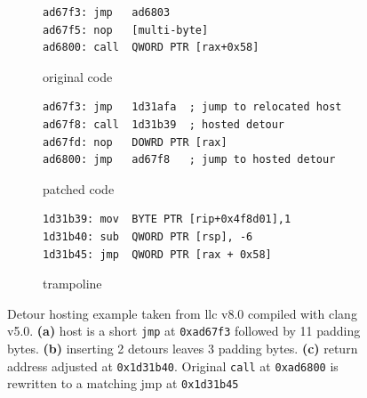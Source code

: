 {%
\begin{figure}[t!]
	\centering
	\vspace{-4pt}
	\begin{subfigure}[t]{\columnwidth}
\begin{lstlisting}[style=custom-x64]
ad67f3: jmp   ad6803
ad67f5: nop   [multi-byte]
ad6800: call  QWORD PTR [rax+0x58]
\end{lstlisting}
		\vspace{-4pt}
		\caption{original code}
		\label{fig:5:original}
	\end{subfigure}
	\begin{subfigure}[t]{\columnwidth}
\begin{lstlisting}[style=custom-x64]
ad67f3: jmp   1d31afa  ; jump to relocated host
ad67f8: call  1d31b39  ; hosted detour
ad67fd: nop   DOWRD PTR [rax]
ad6800: jmp   ad67f8   ; jump to hosted detour
\end{lstlisting}
		\vspace{-4pt}
		\caption{patched code}
		\label{fig:5:patch}
	\end{subfigure}
	\hfill
	\begin{subfigure}[t]{\columnwidth}
		\vspace{-4pt}
\begin{lstlisting}[style=custom-x64]
1d31b39: mov  BYTE PTR [rip+0x4f8d01],1
1d31b40: sub  QWORD PTR [rsp], -6
1d31b45: jmp  QWORD PTR [rax + 0x58]
\end{lstlisting}
		\vspace{-4pt}
		\caption{trampoline}
		\label{fig:5:guest-trampoline}
	\end{subfigure}
	
	\caption{Detour hosting example taken from \textsf{llc} v8.0 compiled with \textsf{clang} v5.0.
		\textbf{(a)} host is a short \texttt{jmp} at \texttt{0xad67f3} followed by 11 padding bytes.
		\textbf{(b)} inserting 2 detours leaves 3 padding bytes.
		\textbf{(c)} return address adjusted at \texttt{0x1d31b40}. Original \texttt{call} at \texttt{0xad6800} is rewritten to a matching \textsf{jmp} at \texttt{0x1d31b45}}
	\label{fig:detour-hosting}
\end{figure}




}

